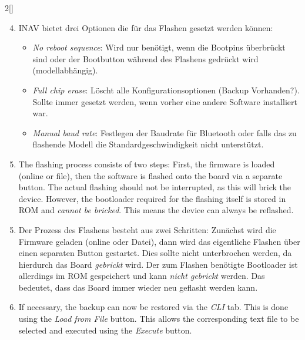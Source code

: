 \begin{paracol}{2}[]
\colger

	
\begin{enumerate}
\setcounter{enumi}{3}
	\item INAV bietet drei Optionen die für das Flashen gesetzt werden können:
	\begin{itemize}
		\item \textsl{No reboot sequence}: Wird nur benötigt, wenn die Bootpins überbrückt sind oder der Bootbutton während des Flashens gedrückt wird (modellabhängig).
		\item \textsl{Full chip erase}: Löscht alle Konfigurationsoptionen (Backup Vorhanden?). Sollte immer gesetzt werden, wenn vorher eine andere Software installiert war.
		\item \textsl{Manual baud rate}: Festlegen der Baudrate für Bluetooth oder falls das zu flashende Modell die Standardgeschwindigkeit nicht unterstützt.
	\end{itemize}
\end{enumerate}

\coleng

	
\begin{enumerate}
\setcounter{enumi}{4}
	\item The flashing process consists of two steps: First, the firmware is loaded (online or file), then the software is flashed onto the board via a separate button. The actual flashing should not be interrupted, as this will brick the device. However, the bootloader required for the flashing itself is stored in ROM and \textsl{cannot be bricked}. This means the device can always be reflashed.
\end{enumerate}

\colger

	
\begin{enumerate}
\setcounter{enumi}{4}
	\item Der Prozess des Flashens besteht aus zwei Schritten: Zunächst wird die Firmware geladen (online oder Datei), dann wird das eigentliche Flashen über einen separaten Button gestartet. Dies sollte nicht unterbrochen werden, da hierdurch das Board \textsl{gebrickt}  wird. Der zum Flashen benötigte Bootloader ist allerdings im ROM gespeichert und kann \textsl{nicht gebrickt} werden. Das bedeutet, dass das Board immer wieder neu geflasht werden kann.
\end{enumerate}

\coleng

	
\begin{enumerate}
\setcounter{enumi}{5}
	\item If necessary, the backup can now be restored via the \textsl{CLI} tab. This is done using the \textsl{Load from File} button. This allows the corresponding text file to be selected and executed using the \textsl{Execute} button.
\end{enumerate}


\end{paracol}
